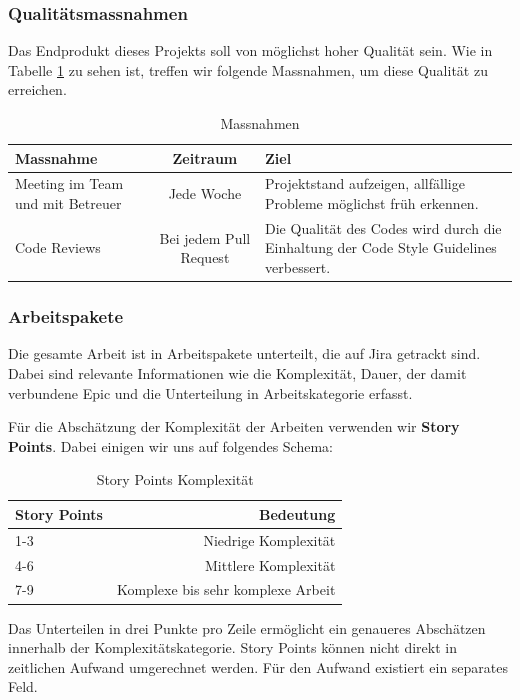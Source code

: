 \subsubsection*{Qualitätsmassnahmen}
Das Endprodukt dieses Projekts soll von möglichst hoher Qualität sein. Wie in Tabelle \ref{tab:Massnahmen} zu sehen ist, treffen wir folgende Massnahmen, um diese Qualität zu erreichen.

\renewcommand{\arraystretch}{2}
\begin{table}[h]
  \begin{tabular}{ | p{3cm} | c | p{5.5cm} | }
  	\hline
    \textbf{Massnahme}			& \textbf{Zeitraum}	 	& \textbf{Ziel} \\
    \hline
    Meeting im Team und mit Betreuer & Jede Woche & Projektstand aufzeigen, allfällige Probleme möglichst früh erkennen.\\
    \hline
    Code Reviews & Bei jedem Pull Request & Die Qualität des Codes wird durch die Einhaltung der Code Style Guidelines verbessert.\\
    \hline
  \end{tabular}
  \caption[Projektplan]{Massnahmen}
  \label{tab:Massnahmen}
\end{table}

\subsubsection*{Arbeitspakete}
Die gesamte Arbeit ist in Arbeitspakete unterteilt, die auf Jira getrackt sind. Dabei sind relevante Informationen wie die Komplexität, Dauer, der damit verbundene Epic und die Unterteilung in Arbeitskategorie erfasst.

Für die Abschätzung der Komplexität der Arbeiten verwenden wir \textbf{Story Points}. Dabei einigen wir uns auf folgendes Schema:

\renewcommand{\arraystretch}{1.5}
\begin{table}[h]
	\centering
	\begin{tabular}{| l | r |}
		\hline
		\textbf{Story Points} & \textbf{Bedeutung}\\
		\hline
		1-3 & Niedrige Komplexität \\
		4-6 & Mittlere Komplexität \\
		7-9 & Komplexe bis sehr komplexe Arbeit\\
		\hline
	\end{tabular}
	\caption[Story-Points]{Story Points Komplexität}
	\label{tab:story-points}
\end{table}
Das Unterteilen in drei Punkte pro Zeile ermöglicht ein genaueres Abschätzen innerhalb der Komplexitätskategorie. Story Points können nicht direkt in zeitlichen Aufwand umgerechnet werden. Für den Aufwand existiert ein separates Feld.


